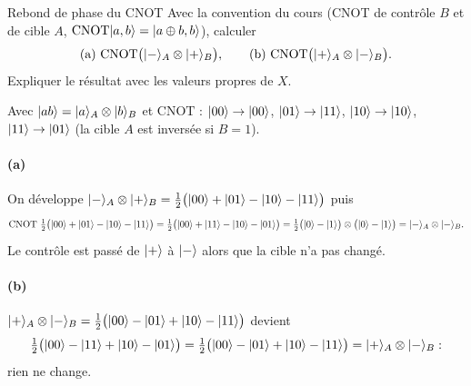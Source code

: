 \begin{exercice}{Rebond de phase du CNOT}\label{ex:kickback}
Avec la convention du cours (CNOT de contrôle $B$ et de cible $A$, $\mathrm{CNOT}|a,b\rangle=|a\oplus b,b\rangle$),
calculer
\[
  \text{(a)}\ \mathrm{CNOT}\big(\ket{-}_A\otimes\ket{+}_B\big),
  \qquad
  \text{(b)}\ \mathrm{CNOT}\big(\ket{+}_A\otimes\ket{-}_B\big).
\]
Expliquer le résultat avec les valeurs propres de $X$.
\end{exercice}
\begin{correction}
Avec $|ab\rangle=|a\rangle_A\otimes|b\rangle_B$ et $\mathrm{CNOT}$ : $|00\rangle\to|00\rangle$, $|01\rangle\to|11\rangle$,
$|10\rangle\to|10\rangle$, $|11\rangle\to|01\rangle$ (la cible $A$ est inversée si $B=1$).

\paragraph{(a)} On développe $|-\rangle_A\otimes|+\rangle_B=\frac12\big(|00\rangle+|01\rangle-|10\rangle-|11\rangle\big)$ puis
\[
  \mathrm{CNOT}\ \tfrac12\big(\ket{00}+\ket{01}-\ket{10}-\ket{11}\big)
  =\tfrac12\big(\ket{00}+\ket{11}-\ket{10}-\ket{01}\big)
  =\tfrac12\big(\ket{0}-\ket{1}\big)\otimes\big(\ket{0}-\ket{1}\big)=\ket{-}_A\otimes\ket{-}_B .
\]
Le contrôle est passé de $|+\rangle$ à $|-\rangle$ alors que la cible n'a pas changé.

\paragraph{(b)} $|+\rangle_A\otimes|-\rangle_B=\frac12\big(|00\rangle-|01\rangle+|10\rangle-|11\rangle\big)$ devient
\[
  \tfrac12\big(|00\rangle-|11\rangle+|10\rangle-|01\rangle\big)=\tfrac12\big(|00\rangle-|01\rangle+|10\rangle-|11\rangle\big)
  =|+\rangle_A\otimes|-\rangle_B :
\]
rien ne change.


\end{correction}
